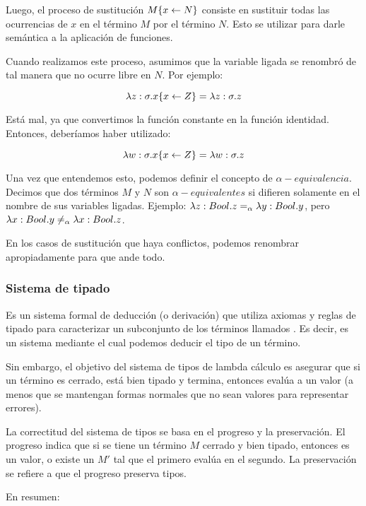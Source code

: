 Luego, el proceso de sustitución $M\{x \leftarrow N\}$ consiste en sustituir todas las ocurrencias  de $x$ en el término $M$ por el término $N$. Esto se utilizar para darle semántica a la aplicación de funciones.

Cuando realizamos este proceso, asumimos que la variable ligada se renombró de tal manera que no ocurre libre en $N$. Por ejemplo:

\[ \lambda z:\sigma.x\{x\leftarrow Z\} = \lambda z:\sigma.z\]

Está mal, ya que convertimos la función constante  en la función identidad. Entonces, deberíamos haber utilizado:

\[ \lambda w:\sigma.x\{x\leftarrow Z\} = \lambda w:\sigma.z\]

Una vez que entendemos esto, podemos definir el concepto de $\alpha-equivalencia$. Decimos que dos términos $M$ y $N$ son $\alpha-equivalentes$ si difieren solamente en el nombre de sus variables ligadas. Ejemplo: $\lambda z:Bool.z =_{\alpha} \lambda y:Bool.y$, pero $\lambda x:Bool.y \neq_{\alpha} \lambda x:Bool.z$.

En los casos de sustitución que haya conflictos, podemos renombrar apropiadamente para que ande todo.

\subsubsection{Sistema de tipado}

Es un sistema formal de deducción (o derivación) que utiliza axiomas y reglas de tipado para caracterizar un subconjunto de los términos llamados . Es decir, es un sistema mediante el cual podemos deducir el tipo de un término.

Sin embargo, el objetivo del sistema de tipos de lambda cálculo es asegurar que si un término es cerrado, está bien tipado y termina, entonces evalúa a un valor (a menos que se mantengan formas normales que no sean valores para representar errores).

La correctitud del sistema de tipos se basa en el progreso y la preservación. El progreso indica que si se tiene un término $M$ cerrado y bien tipado, entonces es un valor, o existe un $M'$ tal que el primero evalúa en el segundo. La preservación se refiere a que el progreso preserva tipos.

En resumen:

